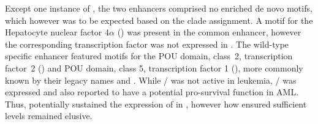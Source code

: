 Except one instance of \motifpolya, the two enhancers comprised no enriched de novo motifs, which however was to be expected based on the clade assignment. A motif for the Hepatocyte nuclear factor 4$\alpha$ () was present in the common enhancer, however the corresponding transcription factor was not expressed in \mllafnine. The wild-type specific enhancer  featured motifs for the POU domain, class~2, transcription factor~2  () and POU domain, class 5, transcription factor 1 (), more commonly known by their legacy names  and .  While  / was not active in \mllafnine leukemia, / was expressed and also reported to have a potential pro-survival function in AML\cite{Advani2010}. Thus,  potentially sustained the expression of  in \dnmtwt, however how \dnmtchip ensured sufficient levels remained elusive.  \vspace{1cm}

